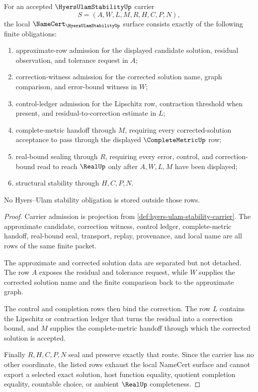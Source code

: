 \begin{theorem}
\label{thm:hyers-ulam-stability-namecert-obligations}
For an accepted $\HyersUlamStabilityUp$ carrier
$$
S=(A,W,L,M,R,H,C,P,N),
$$
the local $\NameCert_{\HyersUlamStabilityUp}$ surface consists exactly of the following finite obligations:
\begin{enumerate}
\item approximate-row admission for the displayed candidate solution, residual observation, and tolerance request in $A$;
\item correction-witness admission for the corrected solution name, graph comparison, and error-bound witness in $W$;
\item control-ledger admission for the Lipschitz row, contraction threshold when present, and residual-to-correction estimate in $L$;
\item complete-metric handoff through $M$, requiring every corrected-solution acceptance to pass through the displayed $\CompleteMetricUp$ row;
\item real-bound sealing through $R$, requiring every error, control, and correction-bound read to reach $\RealUp$ only after $A,W,L,M$ have been displayed;
\item structural stability through $H,C,P,N$.
\end{enumerate}
No Hyers--Ulam stability obligation is stored outside those rows.
\end{theorem}
\begin{proof}
Carrier admission is projection from \autoref{def:hyers-ulam-stability-carrier}. The approximate candidate, correction witness, control ledger, complete-metric handoff, real-bound seal, transport, replay, provenance, and local name are all rows of the same finite packet.

The approximate and corrected solution data are separated but not detached. The row $A$ exposes the residual and tolerance request, while $W$ supplies the corrected solution name and the finite comparison back to the approximate graph.

The control and completion rows then bind the correction. The row $L$ contains the Lipschitz or contraction ledger that turns the residual into a correction bound, and $M$ supplies the complete-metric handoff through which the corrected solution is accepted.

Finally $R,H,C,P,N$ seal and preserve exactly that route. Since the carrier has no other coordinate, the listed rows exhaust the local NameCert surface and cannot export a selected exact solution, host function equality, quotient completion equality, countable choice, or ambient $\RealUp$ completeness.
\end{proof}

